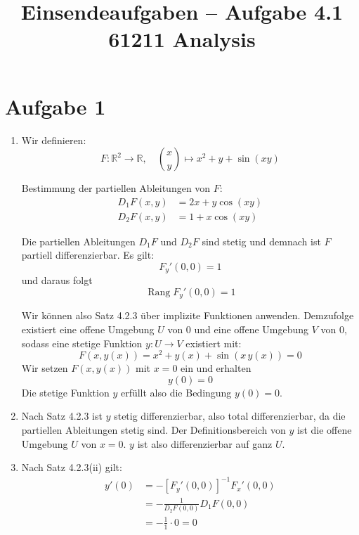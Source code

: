 \documentclass[a4paper,12pt]{article}
\title{Einsendeaufgaben -- Aufgabe 4.1\\[0.5em]
\large 61211 Analysis}
\author{}
\date{}
\begin{document}
\maketitle

\section*{Aufgabe 1}

\begin{enumerate}[label=\alph*)]

    \item
    Wir definieren:
    \[
        F: \mathbb{R}^2 \to \mathbb{R}, \quad \binom{x}{y} \mapsto x^2 + y + \sin(xy)
    \]

    Bestimmung der partiellen Ableitungen von $F$:
    \begin{align*}
        D_1 F(x,y) &= 2x + y\cos(xy) \\
        D_2 F(x,y) &= 1 + x\cos(xy)
    \end{align*}

    Die partiellen Ableitungen $D_1 F$ und $D_2 F$ sind stetig und demnach ist $F$ partiell differenzierbar. Es gilt:
    \[
        F_y'(0,0) = 1
    \]
    und daraus folgt
    \[
        \operatorname{Rang} F_y'(0,0) = 1
    \]

    Wir können also Satz 4.2.3 über implizite Funktionen anwenden. Demzufolge existiert eine offene Umgebung $U$ von $0$ und eine offene Umgebung $V$ von $0$, sodass eine stetige Funktion $y: U \to V$ existiert mit:
    \[
        F(x, y(x)) = x^2 + y(x) + \sin(x\,y(x)) = 0
    \]
    Wir setzen $F(x, y(x))$ mit $x = 0$ ein und erhalten
    \[
        y(0) = 0
    \]
    Die stetige Funktion $y$ erfüllt also die Bedingung $y(0) = 0$.

    \item
    Nach Satz 4.2.3 ist $y$ stetig differenzierbar, also total differenzierbar, da die partiellen Ableitungen stetig sind. Der Definitionsbereich von $y$ ist die offene Umgebung $U$ von $x = 0$. $y$ ist also differenzierbar auf ganz $U$.

    \item
    Nach Satz 4.2.3(ii) gilt:
    \begin{align*}
        y'(0) &= -\left[ F_y'(0,0) \right]^{-1} F_x'(0,0) \\
              &= -\frac{1}{D_2 F(0,0)} D_1 F(0,0) \\
              &= -\frac{1}{1} \cdot 0 = 0
    \end{align*}


\end{enumerate}
\end{document}
